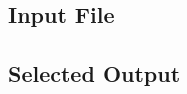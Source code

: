 \subsection{\cM Input File}

\begin{singlespacing}
    
\end{singlespacing}

\subsection{Selected \cM Output}\label{sec:rsq}

\begin{singlespacing}
    
\end{singlespacing}